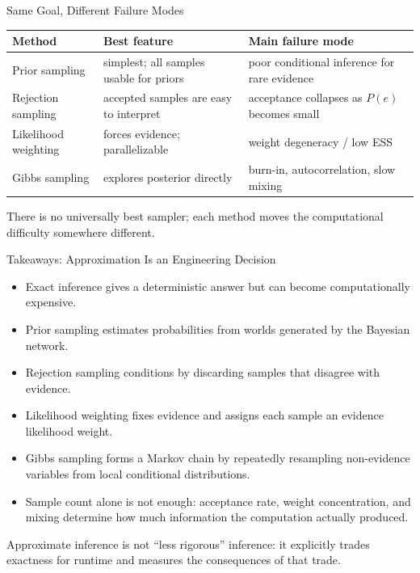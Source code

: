 \documentclass[aspectratio=169,10pt]{beamer}
\begin{document}
\begin{frame}[shrink=10]{Same Goal, Different Failure Modes}
  \begin{center}
  \renewcommand{\arraystretch}{1.28}
  \begin{tabular}{l|p{}|p{}}
    \textbf{Method} & \textbf{Best feature} & \textbf{Main failure mode} \\\hline
    Prior sampling & simplest; all samples usable for priors & poor conditional inference for rare evidence \\
    Rejection sampling & accepted samples are easy to interpret & acceptance collapses as $P(e)$ becomes small \\
    Likelihood weighting & forces evidence; parallelizable & weight degeneracy / low ESS \\
    Gibbs sampling & explores posterior directly & burn-in, autocorrelation, slow mixing
  \end{tabular}
  \end{center}

  \begin{keyidea}
    There is no universally best sampler; each method moves the computational difficulty somewhere different.
  \end{keyidea}
\end{frame}

\begin{frame}[shrink=10]{Takeaways: Approximation Is an Engineering Decision}
  \begin{itemize}
    \item Exact inference gives a deterministic answer but can become computationally expensive.
    \item Prior sampling estimates probabilities from worlds generated by the Bayesian network.
    \item Rejection sampling conditions by discarding samples that disagree with evidence.
    \item Likelihood weighting fixes evidence and assigns each sample an evidence likelihood weight.
    \item Gibbs sampling forms a Markov chain by repeatedly resampling non-evidence variables from local conditional distributions.
    \item Sample count alone is not enough: acceptance rate, weight concentration, and mixing determine how much information the computation actually produced.
  \end{itemize}

  \begin{keyidea}
    Approximate inference is not ``less rigorous'' inference: it explicitly trades exactness for runtime and measures the consequences of that trade.
  \end{keyidea}
\end{frame}
\end{document}
